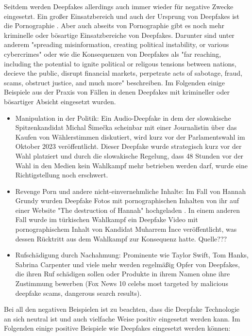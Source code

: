 Seitdem werden Deepfakes allerdings auch immer wieder für negative Zwecke eingesetzt. 
Ein großer Einsatzbereich und auch der Ursprung von Deepfakes ist die Pornographie \autocite{ajderDeeptraceLabReport}. 
Aber auch abseits von Pornographie gibt es noch mehr kriminelle oder bösartige Einsatzbereiche von Deepfakes. 
Darunter sind unter anderem "spreading misinformation, creating political instability, or various cybercrimes" \cite{ranaDeepfakeDetectionSystematic2022} 
oder wie \textcite{gambinDeepfakesCurrentFuture2024} die Konsequenzen von Deepfakes als "far reaching, including the potential to ignite political or religous tensions between nations, decieve the public, disrupt financial markets, perpetrate acts of sabotage, fraud, scams, obstruct justice, and much more" beschreiben.
Im Folgenden einige Beispiele aus der Praxis von Fällen in denen Deepfakes mit krimineller oder bösartiger Absicht eingesetzt wurden.
\begin{itemize}
    \item Manipulation in der Politik: Ein Audio-Deepfake in dem der slowakische Spitzenkandidat Michal Šimečka scheinbar mit einer Journalistin über das Kaufen von Wählerstimmen diskutiert, 
        wird kurz vor der Parlamentswahl im Oktober 2023 veröffentlicht. 
        Dieser Deepfake wurde strategisch kurz vor der Wahl platziert und durch die slowakische Regelung, dass 48 Stunden vor der Wahl in den Medien kein Wahlkampf mehr betrieben werden darf, wurde eine Richtigstellung noch erschwert. \autocite{pawelecPolitischeManipulationUnd2024}
    \item Revenge Porn und andere nicht-einvernehmliche Inhalte: 
        Im Fall von Hannah Grundy wurden Deepfake Fotos mit pornographischen Inhalten von ihr auf einer Website "The destruction of Hannah" hochgeladen \autocite{WomansDeepfakeBetrayal2025}.
        In einem anderen Fall wurde im türkischen Wahlkampf ein Deepfake Video mit pornographischem Inhalt von Kandidat Muharrem İnce veröffentlicht, 
        was dessen Rücktritt aus dem Wahlkampf zur Konsequenz hatte. Quelle???
    \item Rufschädigung durch Nachahmung: Prominente wie Taylor Swift, Tom Hanks, Sabrina Carpenter und viele mehr werden regelmäßig Opfer von Deepfakes, die ihren Ruf schädigen sollen oder Produkte in ihrem Namen ohne ihre Zustimmung bewerben (Fox News 10 celebs most targeted by malicious deepfake scams, dangerous search results).
\end{itemize}
Bei all den negativen Beispielen ist zu beachten, dass die Deepfake Technologie an sich neutral ist und auch vielfache Weise positiv eingesetzt werden kann. Im Folgenden einige positive Beispiele wie Deepfakes eingesetzt werden können:
